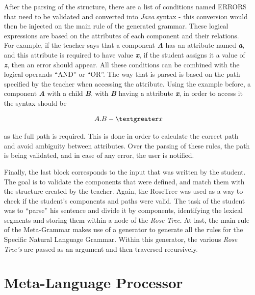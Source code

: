 After the parsing of the structure, there are a list of conditions named ERRORS that need to be validated and converted into \emph{Java} syntax - this conversion would then be injected on the main rule of the generated grammar. These logical expressions are based on the attributes of each component and their relations. For example, if the teacher says that a component \emph{\textbf{A}} has an attribute named \emph{\textbf{a}}, and this attribute is required to have value \emph{\textbf{x}}, if the student assigns it a value of \emph{\textbf{z}}, then an error should appear. All these conditions can be combined with the logical operands ``AND'' or ``OR''. The way that is parsed is based on the path specified by the teacher when accessing the attribute. Using the example before, a component \emph{\textbf{A}} with a child \emph{\textbf{B}}, with \emph{\textbf{B}} having a attribute \emph{\textbf{x}}, in order to access it the syntax should be

\[ A.B -\textgreater x \]

\noindent as the full path is required. This is done in order to calculate the correct path and avoid ambiguity between attributes. Over the parsing of these rules, the path is being validated, and in case of any error, the user is notified.

Finally, the last block corresponds to the input that was written by the student. 
The goal is to validate the components that were defined, and match them with the structure created by the teacher. 
Again, the RoseTree was used as a way to check if the student’s components and paths were valid. 
The task of the student was to ``parse'' his sentence and divide it by components, identifying the lexical segments and storing them within a node of the \emph{Rose Tree}. 
At last, the main rule of the Meta-Grammar makes use of a generator to generate all the rules for the Specific Natural Language Grammar. 
Within this generator, the various \emph{Rose Tree's} are passed as an argument and then traversed recursively.


\section{Meta-Language Processor}

